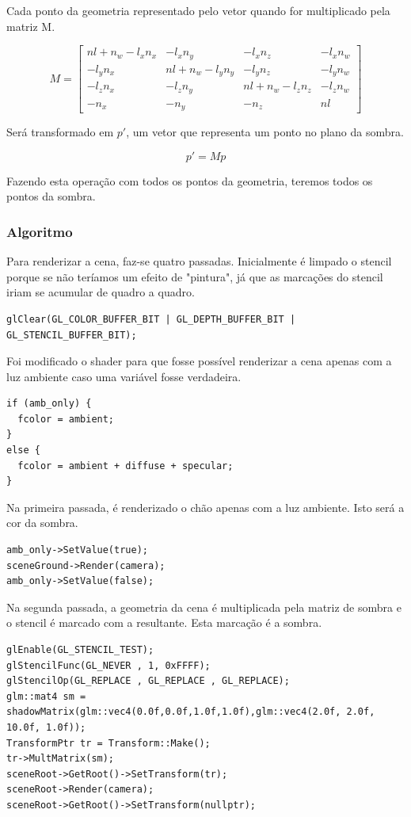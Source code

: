 \documentclass[11pt, a4paper]{article}
\begin{document}
Cada ponto da geometria representado pelo vetor quando for multiplicado pela matriz M.

\[
M = \begin{bmatrix}
  nl + n_{w} - l_{x}n_{x} & -l_{x}n_{y} & -l_{x}n_{z} & -l_{x}n_{w} \\
  -l_{y}n_{x} & nl + n_{w} - l_{y}n_{y} & -l_{y}n_{z} & -l_{y}n_{w} \\
  -l_{z}n_{x} & -l_{z}n_{y} & nl + n_{w} - l_{z}n_{z} & -l_{z}n_{w} \\
  -n_{x} & -n_{y} & -n_{z} & nl
\end{bmatrix}
\]

Será transformado em $p'$, um vetor que representa um ponto no plano da sombra.

$$p' = M p$$

Fazendo esta operação com todos os pontos da geometria, teremos todos os pontos
da sombra.

\subsubsection{Algoritmo}
Para renderizar a cena, faz-se quatro passadas. Inicialmente é limpado o stencil 
porque se não teríamos um efeito de "pintura", já que as marcações do stencil 
iriam se acumular de quadro a quadro.

\begin{verbatim}
glClear(GL_COLOR_BUFFER_BIT | GL_DEPTH_BUFFER_BIT | GL_STENCIL_BUFFER_BIT);
\end{verbatim}

Foi modificado o shader para que fosse possível renderizar a cena apenas com a 
luz ambiente caso uma variável fosse verdadeira.

\begin{verbatim}
if (amb_only) {
  fcolor = ambient;
}
else {
  fcolor = ambient + diffuse + specular;
}
\end{verbatim}

Na primeira passada, é renderizado o chão apenas com a luz ambiente. Isto será
a cor da sombra.

\begin{verbatim}
amb_only->SetValue(true);
sceneGround->Render(camera);
amb_only->SetValue(false);
\end{verbatim}


Na segunda passada, a geometria da cena é multiplicada pela matriz de sombra e o 
stencil é marcado com a resultante. Esta marcação é a sombra.

\begin{verbatim}
glEnable(GL_STENCIL_TEST);
glStencilFunc(GL_NEVER , 1, 0xFFFF);
glStencilOp(GL_REPLACE , GL_REPLACE , GL_REPLACE);
glm::mat4 sm = shadowMatrix(glm::vec4(0.0f,0.0f,1.0f,1.0f),glm::vec4(2.0f, 2.0f, 
10.0f, 1.0f));
TransformPtr tr = Transform::Make();
tr->MultMatrix(sm);
sceneRoot->GetRoot()->SetTransform(tr);
sceneRoot->Render(camera);
sceneRoot->GetRoot()->SetTransform(nullptr);
\end{verbatim}
\end{document}
